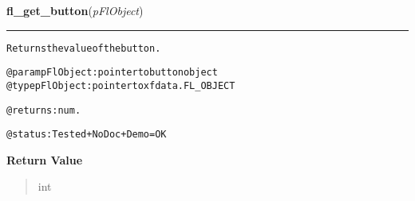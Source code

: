 \hspace{.8\funcindent}\begin{boxedminipage}{\funcwidth}

    \raggedright \textbf{fl\_get\_button}(\textit{pFlObject})

    \vspace{-1.5ex}

    \rule{\textwidth}{0.5\fboxrule}
\setlength{\parskip}{2ex}
\begin{alltt}
Returns the value of the button.

@param pFlObject: pointer to button object
@type pFlObject: pointer to xfdata.FL\_OBJECT

@returns: num.

    @status: Tested + NoDoc + Demo = OK
\end{alltt}

\setlength{\parskip}{1ex}
      \textbf{Return Value}
    \vspace{-1ex}

      \begin{quote}
      int

      \end{quote}

    \end{boxedminipage}

    \label{xformslib:flbutton:fl_set_button}

    \vspace{0.5ex}

